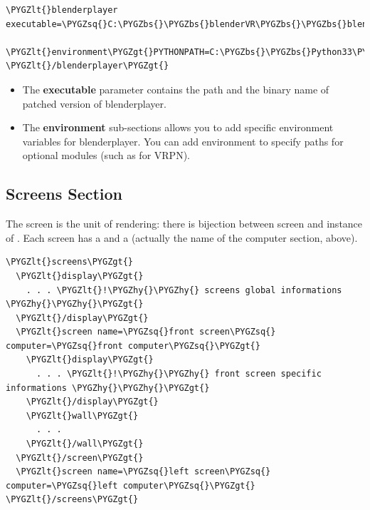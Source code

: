 \documentclass[a4,10pt,openany,oneside]{sphinxmanual}
\def\PYGZbs{\char`\\}
\def\PYGZlt{\char`\<}
\def\PYGZgt{\char`\>}
\def\PYGZhy{\char`\-}
\def\PYGZsq{\char`\'}
\begin{document}
\begin{Verbatim}[commandchars=\\\{\}]
\PYGZlt{}blenderplayer executable=\PYGZsq{}C:\PYGZbs{}\PYGZbs{}blenderVR\PYGZbs{}\PYGZbs{}blender\PYGZbs{}\PYGZbs{}v2.74\PYGZbs{}\PYGZbs{}blenderplayer.exe\PYGZsq{}\PYGZgt{}
  \PYGZlt{}environment\PYGZgt{}PYTHONPATH=C:\PYGZbs{}\PYGZbs{}Python33\PYGZbs{}\PYGZbs{}Lib;C:\PYGZbs{}\PYGZbs{}Python33\PYGZbs{}\PYGZbs{}DLLs;C:\PYGZbs{}\PYGZbs{}Python33\PYGZbs{}\PYGZbs{}Lib\PYGZbs{}\PYGZbs{}site\PYGZhy{}packages\PYGZlt{}/environment\PYGZgt{}
\PYGZlt{}/blenderplayer\PYGZgt{}
\end{Verbatim}
\begin{itemize}
\item {} 
The \textbf{executable} parameter contains the path and the binary name of patched version of blenderplayer.

\item {} 
The \textbf{environment} sub-sections allows you to add specific environment variables for blenderplayer. You can add  environment to specify paths for optional modules (such as for VRPN).

\end{itemize}


\subsection{Screens Section}
\label{components/configuration-file:screens-section}
The screen is the unit of rendering: there is bijection between screen and instance of . Each screen has a  and a  (actually the name of the computer section, above).

\begin{Verbatim}[commandchars=\\\{\}]
\PYGZlt{}screens\PYGZgt{}
  \PYGZlt{}display\PYGZgt{}
    . . . \PYGZlt{}!\PYGZhy{}\PYGZhy{} screens global informations \PYGZhy{}\PYGZhy{}\PYGZgt{}
  \PYGZlt{}/display\PYGZgt{}
  \PYGZlt{}screen name=\PYGZsq{}front screen\PYGZsq{} computer=\PYGZsq{}front computer\PYGZsq{}\PYGZgt{}
    \PYGZlt{}display\PYGZgt{}
      . . . \PYGZlt{}!\PYGZhy{}\PYGZhy{} front screen specific informations \PYGZhy{}\PYGZhy{}\PYGZgt{}
    \PYGZlt{}/display\PYGZgt{}
    \PYGZlt{}wall\PYGZgt{}
      . . .
    \PYGZlt{}/wall\PYGZgt{}
  \PYGZlt{}/screen\PYGZgt{}
  \PYGZlt{}screen name=\PYGZsq{}left screen\PYGZsq{} computer=\PYGZsq{}left computer\PYGZsq{}\PYGZgt{}
\PYGZlt{}/screens\PYGZgt{}
\end{Verbatim}
\end{document}
